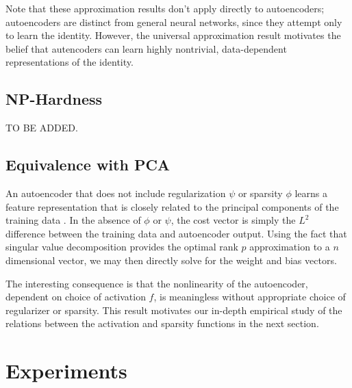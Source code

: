 \documentclass[twocolumn]{article}
\begin{document}
Note that these approximation results don't apply directly to autoencoders; 
autoencoders are distinct from general neural networks, since
they attempt only to learn the identity. However, the universal
approximation result motivates the belief that autencoders can learn
highly nontrivial, data-dependent representations of the identity.

\subsection{NP-Hardness}
TO BE ADDED.

\subsection{Equivalence with PCA}
An autoencoder that does not include regularization $\psi$ or sparsity $\phi$
learns a feature representation that is closely related to the principal
components of the training data \cite{bourlard1988auto}. In the absence of
$\phi$ or $\psi$, the cost vector is simply the $L^2$ difference between the
training data and autoencoder output. Using the fact that singular value
decomposition provides the optimal rank $p$ approximation to a $n$ dimensional
vector, we may then directly solve for the weight and bias vectors.

The interesting consequence is that the nonlinearity of the autoencoder,
dependent on choice of activation $f$, is meaningless without appropriate choice
of regularizer or sparsity. This result motivates our in-depth empirical study
of the relations between the activation and sparsity functions in the next
section.


\section{Experiments}
\end{document}
